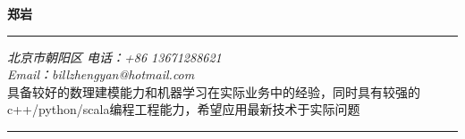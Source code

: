 \documentclass[a4paper,9pt,oneside]{scrartcl}
\newcommand{\Region}{Hong Kong, China}
\newcommand{\bigname}[1]{
    \begin{center}\fontfamily{phv}\selectfont\LARGE\bfseries#1\end{center}
}
\begin{document}
 \selectfont

\begin{CJK*}{UTF8}{gbsn}
\bigname{\Huge 郑岩}

\vspace{-6pt} \rule{\textwidth}{1pt}

\vspace{-1pt} {\small\itshape 北京市朝阳区 \hfill 电话：+86 13671288621\\
       Email：billzhengyan@hotmail.com  %
\\[5pt]}
具备较好的数理建模能力和机器学习在实际业务中的经验，同时具有较强的c++/python/scala编程工程能力，希望应用最新技术于实际问题
\\[-6mm]

\rule{\textwidth}{1pt}

\vspace{6pt}


\end{CJK*}
\end{document}
